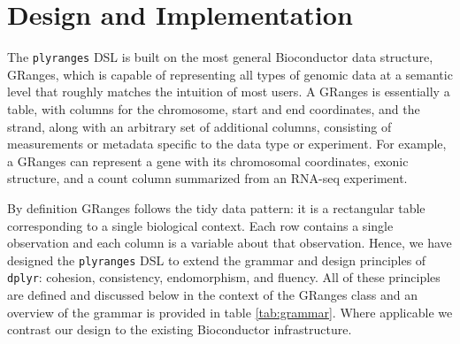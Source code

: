 \documentclass[10pt,letterpaper]{article}
\begin{document}
\section{Design and Implementation}\label{design-and-implementation}

The \texttt{plyranges} DSL is built on the most general Bioconductor
data structure, GRanges, which is capable of representing all types of
genomic data at a semantic level that roughly matches the intuition of
most users. A GRanges is essentially a table, with columns for the
chromosome, start and end coordinates, and the strand, along with an
arbitrary set of additional columns, consisting of measurements or
metadata specific to the data type or experiment. For example, a GRanges
can represent a gene with its chromosomal coordinates, exonic structure,
and a count column summarized from an RNA-seq experiment.

By definition GRanges follows the tidy data pattern: it is a rectangular
table corresponding to a single biological context. Each row contains a
single observation and each column is a variable about that observation.
Hence, we have designed the \texttt{plyranges} DSL to extend the grammar
and design principles of \texttt{dplyr}: cohesion, consistency,
endomorphism, and fluency. All of these principles are defined and
discussed below in the context of the GRanges class and an overview of
the grammar is provided in table \ref{tab:grammar}. Where applicable we
contrast our design to the existing Bioconductor infrastructure.
\end{document}
